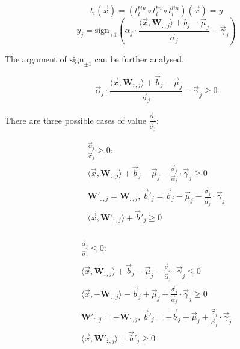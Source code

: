 \documentclass{fithesis}
\newcommand{\mat}[1]{\mathbf{#1}}
\newcommand{\sign}{\mathrm{sign}}
\begin{document}
\begin{equation*}
    t_i(\vec x) = (t_i^{bin} \circ t_i^{bn} \circ t_i^{lin})(\vec x) = y
\end{equation*}
\begin{equation*}
    y_j = \sign_{\pm 1}\left( \alpha_j \cdot \frac{\langle \vec x, \mat W_{:, j}\rangle + b_j - \vec \mu_j}{\vec \sigma_j} - \vec \gamma_j \right)
\end{equation*}

The argument of $\sign_{\pm 1}$ can be further analysed.

\begin{equation*}
    \vec \alpha_j \cdot \frac{\langle \vec x, \mat W_{:, j}\rangle + \vec b_j - \vec \mu_j}{\vec \sigma_j} - \vec \gamma_j \geq 0
\end{equation*}

There are three possible cases of value $\frac{\vec \alpha_j}{\vec \sigma_j}$:

\begin{equation*}
    \begin{matrix}
        \frac{\vec\alpha_j}{\vec\sigma_j} \geq 0: \\
        \langle \vec x, \mat W_{:, j}\rangle + \vec b_j - \vec \mu_j - \frac{\vec \sigma_j}{\vec\alpha_j}\cdot \vec \gamma_j \geq 0\\
        \mat W'_{:, j} = \mat W_{:, j}, \,
        \vec b'_j = \vec b_j - \vec\mu_j - \frac{\vec\sigma_j}{\vec\alpha_j}\cdot \vec\gamma_j\\
        \langle \vec x, \mat W'_{:, j}\rangle + \vec b'_j \geq 0\\
    \end{matrix}
\end{equation*}

\begin{equation*}
    \begin{matrix}
        \frac{\vec\alpha_j}{\vec\sigma_j} \leq 0: \\
        \langle \vec x, \mat W_{:, j}\rangle + \vec b_j - \vec \mu_j - \frac{\vec \sigma_j}{\vec\alpha_j}\cdot \vec \gamma_j \leq 0 \\
        \langle \vec x, -\mat W_{:, j}\rangle - \vec b_j + \vec \mu_j + \frac{\vec \sigma_j}{\vec\alpha_j}\cdot \vec \gamma_j \geq 0\\
        \mat W'_{:, j} = -\mat W_{:, j}, \,
        \vec b'_j = -\vec b_j + \vec\mu_j + \frac{\vec\sigma_j}{\vec\alpha_j}\cdot \vec\gamma_j\\
        \langle \vec x, \mat W'_{:, j}\rangle + \vec b'_j \geq 0\\
    \end{matrix}
\end{equation*}
\end{document}
